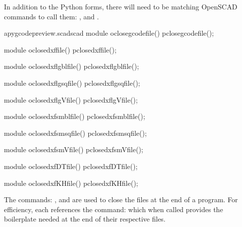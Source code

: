 \documentclass{ltxdoc}
\begin{document}
In addition to the Python forms, there will need to be matching OpenSCAD commands to call them:
, and 
.

\lstset{firstnumber=\thepyscad}
\begin{writecode}{a}{pygcodepreview.scad}{scad}
module oclosegcodefile() {
    pclosegcodefile();
}

module oclosedxffile() {
    pclosedxffile();
}

module oclosedxflgblfile() {
    pclosedxflgblfile();
}

module oclosedxflgsqfile() {
    pclosedxflgsqfile();
}

module oclosedxflgVfile() {
    pclosedxflgVfile();
}

module oclosedxfsmblfile() {
    pclosedxfsmblfile();
}

module oclosedxfsmsqfile() {
    pclosedxfsmsqfile();
}

module oclosedxfsmVfile() {
    pclosedxfsmVfile();
}

module oclosedxfDTfile() {
    pclosedxfDTfile();
}

module oclosedxfKHfile() {
    pclosedxfKHfile();
}

\end{writecode}
\addtocounter{pyscad}{40}
%

The commands: , and  are used to close the files at the end of a program. For efficiency, each references the command:  which when called provides the boilerplate needed at the end of their respective files.
\end{document}
